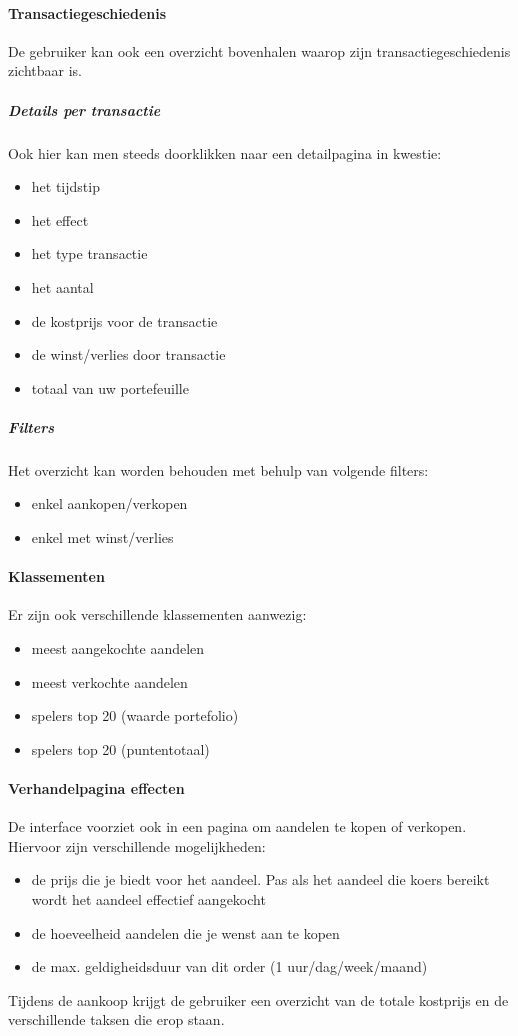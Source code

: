 \paragraph{Transactiegeschiedenis}De gebruiker kan ook een overzicht bovenhalen waarop zijn transactiegeschiedenis zichtbaar is. 
\subparagraph{Details per transactie}Ook hier kan men steeds doorklikken naar een detailpagina in kwestie:
\begin{itemize}
  \setlength{\itemsep}{1pt}
  \setlength{\parskip}{0pt}
  \setlength{\parsep}{0pt}
	\item{het tijdstip}
	\item{het effect}
	\item{het type transactie}
	\item{het aantal}
	\item{de kostprijs voor de transactie}
	\item{de winst/verlies door transactie}
	\item{totaal van uw portefeuille}
\end{itemize}
\subparagraph{Filters}Het overzicht kan worden behouden met behulp van volgende filters:
\begin{itemize}
  \setlength{\itemsep}{1pt}
  \setlength{\parskip}{0pt}
  \setlength{\parsep}{0pt}
	\item{enkel aankopen/verkopen}
	\item{enkel met winst/verlies}
\end{itemize}

\paragraph{Klassementen}Er zijn ook verschillende klassementen aanwezig:
\begin{itemize}
  \setlength{\itemsep}{1pt}
  \setlength{\parskip}{0pt}
  \setlength{\parsep}{0pt}
	\item{meest aangekochte aandelen}
	\item{meest verkochte aandelen}
	\item{spelers top 20 (waarde portefolio)}
	\item{spelers top 20 (puntentotaal)}
\end{itemize}

\paragraph{Verhandelpagina effecten}De interface voorziet ook in een pagina om aandelen te kopen of verkopen. Hiervoor zijn verschillende mogelijkheden:
\begin{itemize}
  \setlength{\itemsep}{1pt}
  \setlength{\parskip}{0pt}
  \setlength{\parsep}{0pt}
	\item{de prijs die je biedt voor het aandeel. Pas als het aandeel die koers bereikt wordt het aandeel effectief aangekocht}
	\item{de hoeveelheid aandelen die je wenst aan te kopen}
	\item{de max. geldigheidsduur van dit order (1 uur/dag/week/maand)}
\end{itemize}
Tijdens de aankoop krijgt de gebruiker een overzicht van de totale kostprijs en de verschillende taksen die erop staan.


